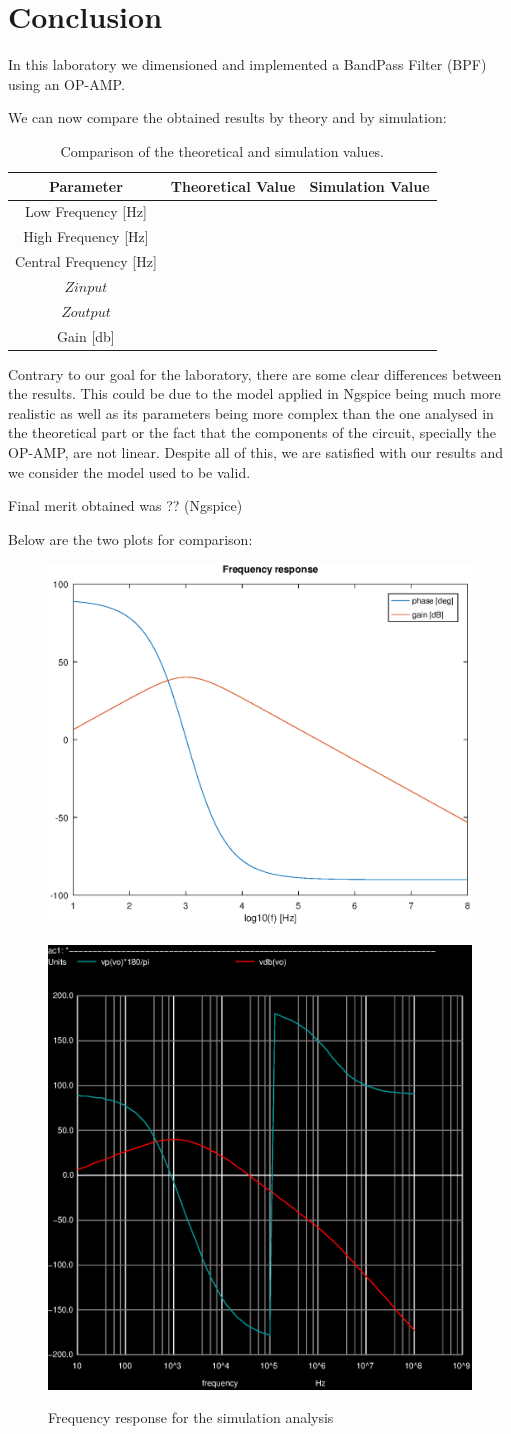 \newpage
\section{Conclusion}
\label{sec:conclusion}

In this laboratory we dimensioned and implemented a BandPass Filter (BPF) using an OP-AMP.

We can now compare the obtained results by theory and by simulation:

\begin{table}[h]
    \centering
    \begin{tabular}{|c|c|c|}
    \hline
    {\bf Parameter} & {\bf Theoretical Value}& {\bf Simulation Value}\\
    \hline\hline
      Low Frequency [Hz] &  & \\
    \hline
    High Frequency [Hz] &  & \\
    \hline
   Central Frequency [Hz] &  & \\
   \hline
     $Z{input}$ &  & \\
    \hline
     $Z{output}$ &  & \\
    \hline
      Gain [db] &  & \\
    \hline
    \end{tabular}
    \caption{Comparison of the theoretical and simulation values.}
    \label{tab:values}
\end{table}

Contrary to our goal for the laboratory, there are some clear differences between the results. This could be due to the model applied in Ngspice being much more realistic as well as its parameters being more complex than the one analysed in the theoretical part or the fact that the components of the circuit, specially the OP-AMP, are not linear. 
Despite all of this, we are satisfied with our results and we consider the model used to be valid.


Final merit obtained was ?? (Ngspice)

Below are the two plots for comparison:

\begin{figure}[!ht] \centering
\caption{Frequency response $V_o$(f)/$V_i$(f)}
\includegraphics[width=0.4\linewidth]{theory.eps}
\caption{Frequency response for the simulation analysis}
\includegraphics[width=0.4\linewidth]{simulation.eps}
\label{fig:theoretical}
\end{figure}
